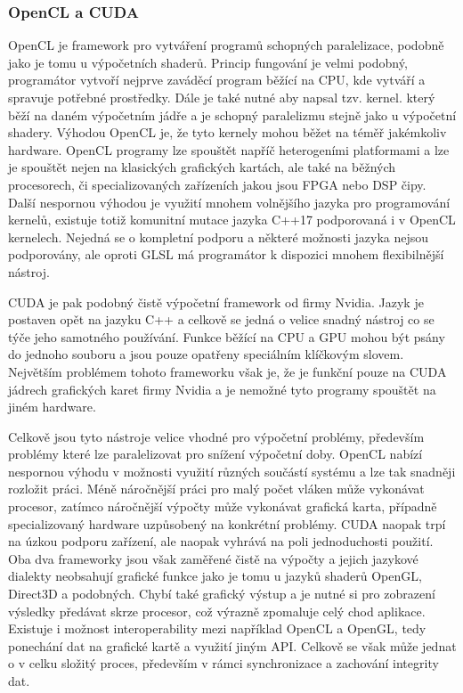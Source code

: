 \subsubsection{OpenCL a CUDA}
OpenCL je framework pro vytváření programů schopných paralelizace, podobně jako je tomu u výpočetních shaderů. Princip fungování je velmi podobný, programátor vytvoří nejprve zaváděcí program běžící na CPU, kde vytváří a spravuje potřebné prostředky. Dále je také nutné aby napsal tzv. kernel. který běží na daném výpočetním jádře a je schopný paralelizmu stejně jako u výpočetní shadery. Výhodou OpenCL je, že tyto kernely mohou běžet na téměř jakémkoliv hardware. OpenCL programy lze spouštět napříč heterogeními platformami a lze je spouštět nejen na klasických grafických kartách, ale také na běžných procesorech, či specializovaných zařízeních jakou jsou FPGA nebo DSP čipy. Další nespornou výhodou je využití mnohem volnějšího jazyka pro programování kernelů, existuje totiž komunitní mutace jazyka C++17 podporovaná i v OpenCL kernelech. Nejedná se o kompletní podporu a některé možnosti jazyka nejsou podporovány, ale oproti GLSL má programátor k dispozici mnohem flexibilnější nástroj. 

CUDA je pak podobný čistě výpočetní framework od firmy Nvidia. Jazyk je postaven opět na jazyku C++ a celkově se jedná o velice snadný nástroj co se týče jeho samotného používání. Funkce běžící na CPU a GPU mohou být psány do jednoho souboru a jsou pouze opatřeny speciálním klíčkovým slovem. Největším problémem tohoto frameworku však je, že je funkční pouze na CUDA jádrech grafických karet firmy Nvidia a je nemožné tyto programy spouštět na jiném hardware.

Celkově jsou tyto nástroje velice vhodné pro výpočetní problémy, především problémy které lze paralelizovat pro snížení výpočetní doby. OpenCL nabízí nespornou výhodu v možnosti využití různých součástí systému a lze tak snadněji rozložit práci. Méně náročnější práci pro malý počet vláken může vykonávat procesor, zatímco náročnější výpočty může vykonávat grafická karta, případně specializovaný hardware uzpůsobený na konkrétní problémy. CUDA naopak trpí na úzkou podporu zařízení, ale naopak vyhrává na poli jednoduchosti použití. Oba dva frameworky jsou však zaměřené čistě na výpočty a jejich jazykové dialekty neobsahují grafické funkce jako je tomu u jazyků shaderů OpenGL, Direct3D a podobných. Chybí také grafický výstup a je nutné si pro zobrazení výsledky předávat skrze procesor, což výrazně zpomaluje celý chod aplikace. Existuje i možnost interoperability mezi například OpenCL a OpenGL, tedy ponechání dat na grafické kartě a využití jiným API. Celkově se však může jednat o v celku složitý proces, především v rámci synchronizace a zachování integrity dat.


